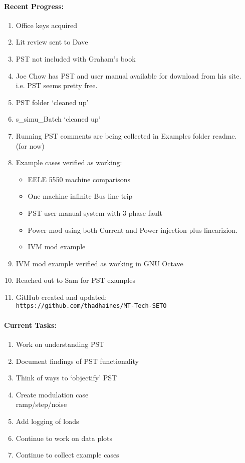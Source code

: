 \documentclass[12pt]{article}
\begin{document}
\begin{multicols}{2}
\raggedright

\paragraph{Recent Progress:}
	\begin{enumerate}
		\itemsep0em 
		\item Office keys acquired
		\item Lit review sent to Dave
		\item PST not included with Graham's book 
		\item Joe Chow has PST and user manual available for download from his site.
		\\ i.e. PST seems pretty free.
		\item PST folder `cleaned up'
		\item s\_simu\_Batch `cleaned up'
		\item Running PST comments are being collected in Examples folder readme. \\ (for now)
		\item Example cases verified as working:
		\begin{itemize}
			\item EELE 5550 machine comparisons
			\item One machine infinite Bus line trip
			\item PST user manual system with 3 phase fault
			\item Power mod using both Current and Power injection plus linearizion.
			\item IVM mod example
		\end{itemize}
		\item IVM mod example verified as working in GNU Octave
		\item Reached out to Sam for PST examples
		\item GitHub created and updated:\\
	{\footnotesize	\verb|https://github.com/thadhaines/MT-Tech-SETO| }\\
	\end{enumerate}
	
\vfill\null
\columnbreak
	
\paragraph{Current Tasks:}
	\begin{enumerate}
		\itemsep0em 
		\item Work on understanding PST
		\item Document findings of PST functionality
		\item Think of ways to `objectify' PST
		\item Create modulation case \\ ramp/step/noise 
		\item Add logging of loads
		\item Continue to work on data plots 
		\item Continue to collect example cases
\end{enumerate}


\end{multicols}
\end{document}
